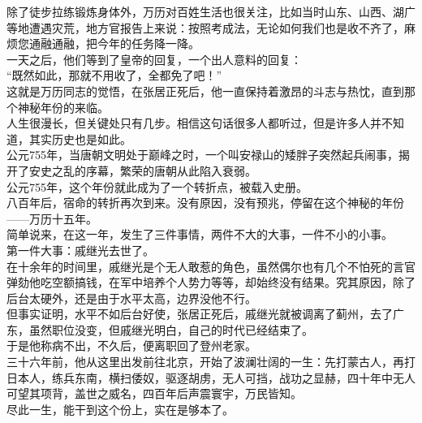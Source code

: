 \begin{multicols}{\theparacolNo}
除了徒步拉练锻炼身体外，万历对百姓生活也很关注，比如当时山东、山西、湖广等地遭遇灾荒，地方官报告上来说：按照考成法，无论如何我们也是收不齐了，麻烦您通融通融，把今年的任务降一降。\\

一天之后，他们等到了皇帝的回复，一个出人意料的回复：\\

“既然如此，那就不用收了，全都免了吧！”\\

这就是万历同志的觉悟，在张居正死后，他一直保持着激昂的斗志与热忱，直到那个神秘年份的来临。\\

人生很漫长，但关键处只有几步。相信这句话很多人都听过，但是许多人并不知道，其实历史也是如此。\\

公元755年，当唐朝文明处于巅峰之时，一个叫安禄山的矮胖子突然起兵闹事，揭开了安史之乱的序幕，繁荣的唐朝从此陷入衰弱。\\

公元755年，这个年份就此成为了一个转折点，被载入史册。\\

八百年后，宿命的转折再次到来。没有原因，没有预兆，停留在这个神秘的年份——万历十五年。\\

简单说来，在这一年，发生了三件事情，两件不大的大事，一件不小的小事。\\

第一件大事：戚继光去世了。\\

在十余年的时间里，戚继光是个无人敢惹的角色，虽然偶尔也有几个不怕死的言官弹劾他吃空额搞钱，在军中培养个人势力等等，却始终没有结果。究其原因，除了后台太硬外，还是由于水平太高，边界没他不行。\\

但事实证明，水平不如后台好使，张居正死后，戚继光就被调离了蓟州，去了广东，虽然职位没变，但戚继光明白，自己的时代已经结束了。\\

于是他称病不出，不久后，便离职回了登州老家。\\

三十六年前，他从这里出发前往北京，开始了波澜壮阔的一生：先打蒙古人，再打日本人，练兵东南，横扫倭奴，驱逐胡虏，无人可挡，战功之显赫，四十年中无人可望其项背，盖世之威名，四百年后声震寰宇，万民皆知。\\

尽此一生，能干到这个份上，实在是够本了。\\


\end{multicols}
